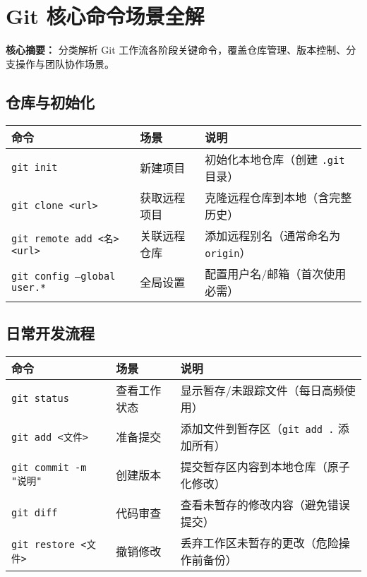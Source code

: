 \section{Git 核心命令场景全解}
\textbf{核心摘要：}  
分类解析 Git 工作流各阶段关键命令，覆盖仓库管理、版本控制、分支操作与团队协作场景。

\subsection{仓库与初始化}
\begin{center}
\begin{tabular}{llp{8cm}}
    \toprule
    \textbf{命令} & \textbf{场景} & \textbf{说明} \\
    \midrule
    \texttt{git init} & 新建项目 & 初始化本地仓库（创建 \texttt{.git} 目录） \\
    \texttt{git clone <url>} & 获取远程项目 & 克隆远程仓库到本地（含完整历史） \\
    \texttt{git remote add <名> <url>} & 关联远程仓库 & 添加远程别名（通常命名为 \texttt{origin}） \\
    \texttt{git config --global user.*} & 全局设置 & 配置用户名/邮箱（首次使用必需） \\
    \bottomrule
\end{tabular}
\end{center}

\subsection{日常开发流程}
\begin{center}
\begin{tabular}{llp{8cm}}
    \toprule
    \textbf{命令} & \textbf{场景} & \textbf{说明} \\
    \midrule
    \texttt{git status} & 查看工作状态 & 显示暂存/未跟踪文件（每日高频使用） \\
    \texttt{git add <文件>} & 准备提交 & 添加文件到暂存区（\texttt{git add .} 添加所有） \\
    \texttt{git commit -m "说明"} & 创建版本 & 提交暂存区内容到本地仓库（原子化修改） \\
    \texttt{git diff} & 代码审查 & 查看未暂存的修改内容（避免错误提交） \\
    \texttt{git restore <文件>} & 撤销修改 & 丢弃工作区未暂存的更改（危险操作前备份） \\
    \bottomrule
\end{tabular}
\end{center}

